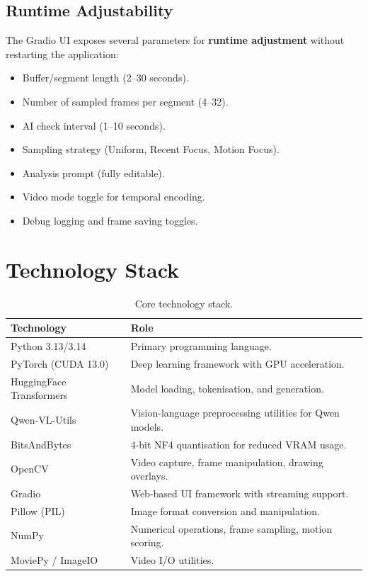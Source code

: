 \documentclass[12pt,a4paper]{article}
\begin{document}
\subsection{Runtime Adjustability}

The Gradio UI exposes several parameters for \textbf{runtime adjustment} without restarting the application:

\begin{itemize}[noitemsep]
    \item Buffer/segment length (2--30 seconds).
    \item Number of sampled frames per segment (4--32).
    \item AI check interval (1--10 seconds).
    \item Sampling strategy (Uniform, Recent Focus, Motion Focus).
    \item Analysis prompt (fully editable).
    \item Video mode toggle for temporal encoding.
    \item Debug logging and frame saving toggles.
\end{itemize}

\section{Technology Stack}

\begin{table}[H]
\centering
\caption{Core technology stack.}
\label{tab:techstack}
\begin{tabular}{@{}lp{8.5cm}@{}}
\toprule
\textbf{Technology} & \textbf{Role} \\
\midrule
Python 3.13/3.14 & Primary programming language. \\
PyTorch (CUDA 13.0) & Deep learning framework with GPU acceleration. \\
HuggingFace Transformers & Model loading, tokenisation, and generation. \\
Qwen-VL-Utils & Vision-language preprocessing utilities for Qwen models. \\
BitsAndBytes & 4-bit NF4 quantisation for reduced VRAM usage. \\
OpenCV & Video capture, frame manipulation, drawing overlays. \\
Gradio & Web-based UI framework with streaming support. \\
Pillow (PIL) & Image format conversion and manipulation. \\
NumPy & Numerical operations, frame sampling, motion scoring. \\
MoviePy / ImageIO & Video I/O utilities. \\
\bottomrule
\end{tabular}
\end{table}
\end{document}
